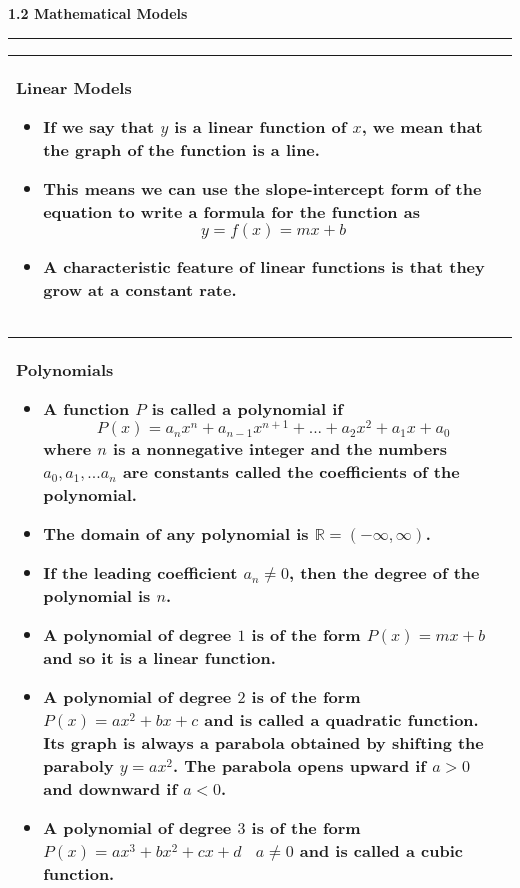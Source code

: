 \documentclass[fleqn]{article}
\begin{document}
\begin{center}
{\begin{tabularx}{.9\textwidth}{|X|}
\hline
\end{tabularx}}
\vspace{36pt}	

\Large\textbf{1.2 Mathematical Models}

\noindent\hfill\rule{0.3\textwidth}{.4pt}\hfill
\vspace{12pt}

\large
\def\arraystretch{1.3}
{\setlength{\tabcolsep}{16pt}
\begin{tabularx}{.9\textwidth}{|X|}
\hline
	\vspace{1pt}
	\textbf{Linear Models}
	\begin{itemize}
	\item If we say that $y$ is a \textbf{linear function} of $x$, we mean that the graph of the function is a line.
	\item This means we can use the slope-intercept form of the equation to write a formula for the function as
	$$y = f(x) = mx + b$$
	\item A characteristic feature of linear functions is that they grow at a constant rate.
	\end{itemize} \\
\hline
\end{tabularx}}
\vspace{12pt}	

\def\arraystretch{1.3}
{\setlength{\tabcolsep}{16pt}
\begin{tabularx}{.9\textwidth}{|X|}
\hline
	\vspace{1pt}
	\textbf{Polynomials}
	\begin{itemize}
	\item A function $P$ is called a \textbf{polynomial} if
	$$P(x) = a_nx^n + a_{n-1}x^{n+1} + ... + a_2x^2 + a_1x + a_0$$
	where $n$ is a nonnegative integer and the numbers $a_0, a_1, ... a_n$ are constants called the \textbf{coefficients} of the polynomial.
	\item The domain of any polynomial is $\mathbb{R} = (-\infty, \infty)$.
	\item If the leading coefficient $a_n \ne 0$, then the \textbf{degree} of the polynomial is $n$.
	\item A polynomial of degree $1$ is of the form $P(x) = mx +b$ and so it is a \textbf{linear function}. 
	\item A polynomial of degree $2$ is of the form $P(x) = ax^2 + bx + c$ and is called a \textbf{quadratic function}. Its graph is always a parabola obtained by shifting the paraboly $y = ax^2$.  The parabola opens upward if $a>0$ and downward if $a<0$.
	\item A polynomial of degree $3$ is of the form $P(x) = ax^3 + bx^2 + cx + d \:\:\:\: a \ne 0$ and is called a \textbf{cubic function}. 
	\end{itemize} \\
\hline
\end{tabularx}}
\vspace{24pt}	


\end{center}
\end{document}
